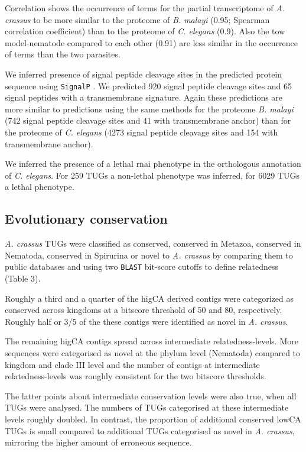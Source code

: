 \documentclass[10pt]{bmc_article}
\newenvironment{bmcformat}{\begin{raggedright}\baselineskip20pt\sloppy\setboolean{publ}{false}}{\end{raggedright}\baselineskip20pt\sloppy}
\begin{document}
\begin{bmcformat}
Correlation shows the occurrence of terms for the partial
transcriptome of \textit{A. crassus} to be more similar to the
proteome of \textit{B. malayi} (0.95;
Spearman correlation coefficient) than to the proteome of
\textit{C. elegans} (0.9). Also the tow
model-nematode compared to each other (0.91)
are less similar in the occurrence of terms than the two parasites.

We inferred presence of signal peptide cleavage sites in the predicted
protein sequence using \texttt{SignalP} \cite{pmid21959131}. We predicted
920 signal peptide cleavage sites and 65 signal
peptides with a transmembrane signature. Again these predictions are
more similar to predictions using the same methods for the proteome
\textit{B. malayi} (742 signal peptide cleavage sites and
41 with transmembrane anchor) than for the proteome of
\textit{C. elegans} (4273 signal peptide cleavage sites
and 154 with transmembrane anchor).

We inferred the presence of a lethal rnai phenotype in the orthologous
annotation of \textit{C. elegans}. For 259
TUGs a non-lethal phenotype was inferred, for
6029 TUGs a lethal phenotype.

\subsection*{Evolutionary conservation}

\textit{A. crassus} TUGs were classified as conserved, conserved in
Metazoa, conserved in Nematoda, conserved in Spirurina or novel to
\textit{A. crassus} by comparing them to public databases and using
two \texttt{BLAST} bit-score cutoffs to define relatedness (Table 3).

Roughly a third and a quarter of the higCA derived contigs were
categorized as conserved across kingdoms at a bitscore threshold of 50
and 80, respectively. Roughly half or 3/5 of the these contigs were
identified as novel in \textit{A. crassus}.

The remaining higCA contigs spread across intermediate
relatedness-levels. More sequences were categorised as novel at the
phylum level (Nematoda) compared to kingdom and clade III level and the
number of contigs at intermediate relatedness-levels was roughly
consistent for the two bitscore thresholds.

The latter points about intermediate conservation levels were also
true, when all TUGs were analysed. The numbers of TUGs categorised at
these intermediate levels roughly doubled. In contrast, the proportion
of additional conserved lowCA TUGs is small compared to additional
TUGs categorised as novel in \textit{A. crassus}, mirroring the higher
amount of erroneous sequence.


\end{bmcformat}
\end{document}
